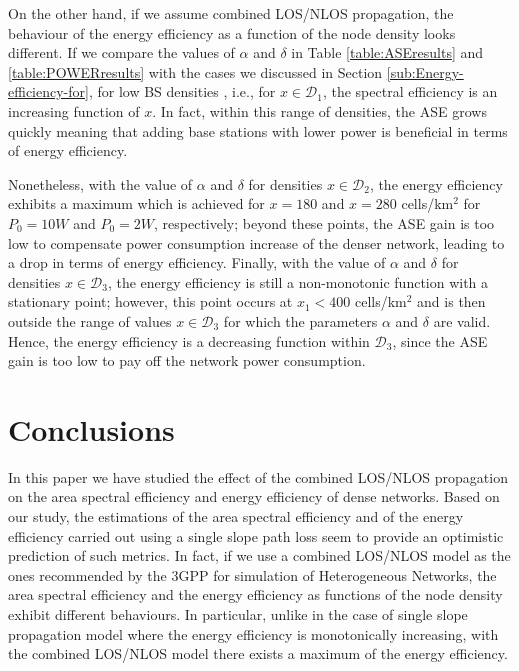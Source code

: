 \documentclass[twocoumn]{IEEEtran}
\begin{document}
On the other hand, if we assume combined LOS/NLOS propagation, the
behaviour of the energy efficiency as a function of the node density
looks different. If we compare the values of $\alpha$ and $\delta$ in Table \ref{table:ASEresults} and \ref{table:POWERresults} with the cases we discussed in Section \ref{sub:Energy-efficiency-for}, for low BS densities , i.e., for $x\in\mathcal{D}_{\mathrm{1}}$, the spectral efficiency is an increasing function of $x$. In fact, within this range of densities, the ASE grows quickly meaning that adding base stations with lower power is beneficial in terms of energy efficiency. 

Nonetheless, with the value of $\alpha$ and $\delta$ for densities $x\in\mathcal{D}_{\mathrm{2}}$, the energy efficiency exhibits a maximum which is achieved for $x=180$ and $x=280$ cells/km$^{2}$ for $P_0=10W$ and $P_0=2W$, respectively; beyond these points, the ASE gain is too low to compensate power consumption increase of the denser network, leading to a drop in terms of energy efficiency. 
Finally, with the value of $\alpha$ and $\delta$ for densities $x\in\mathcal{D}_{\mathrm{3}}$, the energy efficiency is still a non-monotonic function with a stationary point; however, this point occurs at $x_1<400$ 	cells/km$^{2}$ and is then outside the range of values $x\in\mathcal{D}_{\mathrm{3}}$ for which the parameters $\alpha$ and $\delta$ are valid. Hence, the energy efficiency is a decreasing function within $\mathcal{D}_{\mathrm{3}}$, since the ASE gain is too low to pay off the network power consumption.
 

\section{Conclusions} \label{sec:conclusions}

In this paper we have studied the effect of the combined LOS/NLOS
propagation on the area spectral efficiency and energy efficiency
of dense networks. Based on our study, the estimations of the area
spectral efficiency and of  the energy efficiency carried out using a single slope path
loss seem to provide an optimistic prediction of such metrics. In
fact, if we use a combined LOS/NLOS model as the ones recommended
by the 3GPP for simulation of Heterogeneous Networks, the area spectral
efficiency and the energy efficiency as functions of the node density
exhibit different behaviours. In particular, unlike in the case of
single slope propagation model where the energy efficiency is monotonically
increasing, with the combined LOS/NLOS model there exists a maximum
of the energy efficiency. 
\end{document}
